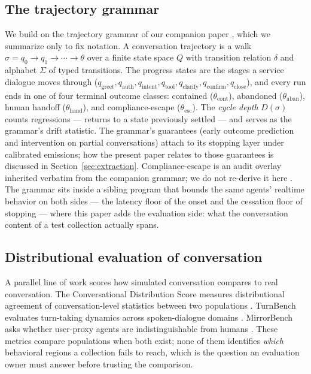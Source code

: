 \subsection{The trajectory grammar}
We build on the trajectory grammar of our companion paper \citep{garcia2026grammar}, which we
summarize only to fix notation.
A conversation trajectory is a walk $\sigma = q_0 \to q_1 \to \cdots \to \theta$ over a finite
state space $Q$ with transition relation $\delta$ and alphabet $\Sigma$ of typed transitions.
The progress states are the stages a service dialogue moves through
($q_{\mathrm{greet}}, q_{\mathrm{auth}}, q_{\mathrm{intent}}, q_{\mathrm{tool}},
q_{\mathrm{clarify}}, q_{\mathrm{confirm}}, q_{\mathrm{close}}$), and every run ends in one of
four terminal outcome classes: contained ($\theta_{\mathrm{cont}}$), abandoned
($\theta_{\mathrm{aban}}$), human handoff ($\theta_{\mathrm{hand}}$), and compliance-escape
($\theta_{\mathrm{esc}}$).
The \emph{cycle depth} $D(\sigma)$ counts regressions --- returns to a state previously
settled --- and serves as the grammar's drift statistic.
The grammar's guarantees (early outcome prediction and intervention on partial conversations)
attach to its stopping layer under calibrated emissions; how the present paper relates to
those guarantees is discussed in Section~\ref{sec:extraction}.
Compliance-escape is an audit overlay inherited verbatim from the companion grammar; we do not
re-derive it here \citep{garcia2026grammar}.
The grammar sits inside a sibling program that bounds the same agents' realtime behavior on
both sides --- the latency floor of the onset \citep{garcia2026latencyfloor} and the cessation
floor of stopping \citep{garcia2026cessationfloor} --- where this paper adds the evaluation
side: what the conversation content of a test collection actually spans.

\subsection{Distributional evaluation of conversation}
A parallel line of work scores how simulated conversation compares to real conversation.
The Conversational Distribution Score measures distributional agreement of
conversation-level statistics between two populations \citep{cds2026}.
TurnBench evaluates turn-taking dynamics across spoken-dialogue domains
\citep{turnbench2026}.
MirrorBench asks whether user-proxy agents are indistinguishable from humans
\citep{mirrorbench2026}.
These metrics compare populations when both exist; none of them identifies \emph{which}
behavioral regions a collection fails to reach, which is the question an evaluation owner
must answer before trusting the comparison.

